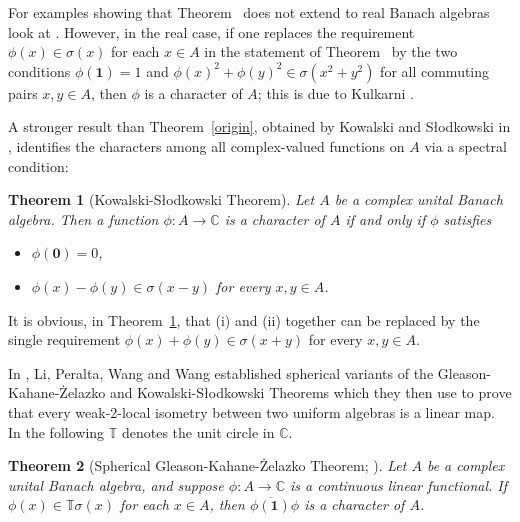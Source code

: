 \documentclass{amsart}
\newtheorem{theorem}{Theorem}[section]
\theoremstyle{definition}
\theoremstyle{remark}
\begin{document}
	   For examples showing that Theorem~ does not extend to real Banach algebras look at \cite[p.43]{Moslehian}. However, in the real case, if one replaces the requirement $\phi(x)\in\sigma(x)$ for each $x\in A$ in the statement of Theorem~  by the two conditions $\phi(\mathbf 1)=1$ and $\phi(x)^2+\phi(y)^2\in\sigma(x^2+y^2)$ for all commuting pairs $x,y\in A$, then $\phi$ is a character of $A$; this is due to Kulkarni \cite{Kulkarni}.
	
			A stronger result than Theorem~\ref{origin}, obtained by Kowalski and S\l{}odkowski in \cite{Kowalski}, identifies the characters among all complex-valued functions on $A$ via a spectral condition:
	

	
		\begin{theorem}[Kowalski-S\l{}odkowski Theorem]\label{allfunctions}
		Let $A$ be a complex unital Banach algebra. Then a function $\phi:A\rightarrow\mathbb C$ is a character of $A$ if and only if $\phi$  satisfies
		\begin{itemize}
			\item[(i)]{$\phi(\mathbf 0)=0$,}
			\item[(ii)]{$\phi(x)-\phi(y)\in\sigma(x-y)$ for every $x,y\in A$. }
		\end{itemize} 
	\end{theorem}
	
	It is obvious, in Theorem~\ref{allfunctions}, that (i) and (ii) together 
can be replaced by the single requirement $\phi(x)+\phi(y)\in\sigma(x+y)$ for every $x,y\in A.$
	

    
     In \cite{Li}, Li, Peralta, Wang and Wang established spherical variants of the Gleason-Kahane-\.{Z}elazko and Kowalski-S\l{}odkowski Theorems which they then use to prove that every weak-2-local
    isometry between two uniform algebras is a linear map. In the following $\mathbb T$ denotes the unit circle in $\mathbb C$. 
	
		\begin{theorem}[Spherical Gleason-Kahane-\.{Z}elazko Theorem; {\cite[Proposition 2.2]{Li}}]\label{sphere1}
		Let $A$ be a complex unital Banach algebra, and suppose $\phi:A\rightarrow\mathbb C$ is a continuous linear functional. If $\phi(x)\in\mathbb T\sigma(x)$ for each $x\in A$, then $\overline{\phi(\mathbf 1)}\phi$ is a character of $A$. 
	\end{theorem}
	
\end{document}
